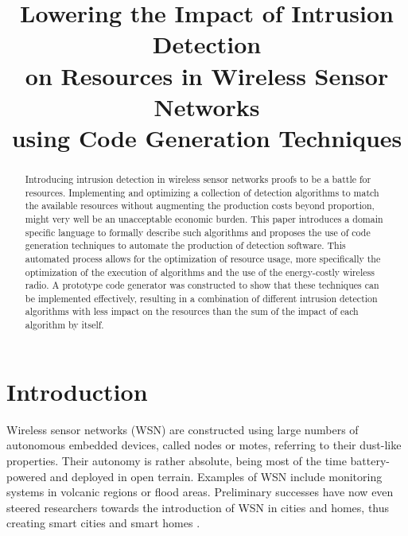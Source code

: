 \documentclass[conference]{IEEEtran}
\begin{document}
\expandafter\def\csname PY@tok@err\endcsname{}

\title{Lowering the Impact of Intrusion Detection\\
on Resources in Wireless Sensor Networks\\
using Code Generation Techniques}

\author{%
}

\maketitle

\begin{abstract}
  
Introducing intrusion detection in wireless sensor networks proofs to be a
battle for resources. Implementing and optimizing a collection of detection
algorithms to match the available resources without augmenting the production
costs beyond proportion, might very well be an unacceptable economic burden.
This paper introduces a domain specific language to formally describe such
algorithms and proposes the use of code generation techniques to automate the
production of detection software. This automated process allows for the
optimization of resource usage, more specifically the optimization of the
execution of algorithms and the use of the energy-costly wireless radio. A
prototype code generator was constructed to show that these techniques can be
implemented effectively, resulting in a combination of different intrusion
detection algorithms with less impact on the resources than the sum of the
impact of each algorithm by itself.

\end{abstract}

\section{Introduction}

Wireless sensor networks (WSN) are constructed using large numbers of
autonomous embedded devices, called nodes or motes, referring to their
dust-like properties. Their autonomy is rather absolute, being most of the time
battery-powered and deployed in open terrain. Examples of WSN include
monitoring systems in volcanic regions or flood areas. Preliminary successes
have now even steered researchers towards the introduction of WSN in cities and
homes, thus creating smart cities \cite{schaffers2011smart} and smart homes
\cite{chan2008review}.
\end{document}
